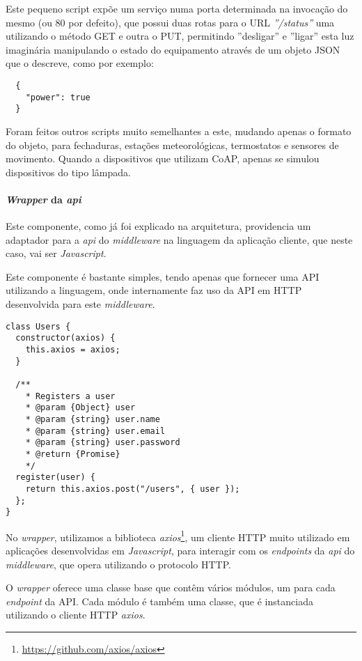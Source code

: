 Este pequeno script expõe um serviço numa porta determinada na invocação do mesmo (ou 80 por defeito), que possui duas rotas para o URL \textit{''/status''} uma utilizando o método GET e outra o PUT, permitindo ''desligar'' e ''ligar'' esta luz imaginária manipulando o estado do equipamento através de um objeto JSON que o descreve, como por exemplo:

\begin{verbatim}
  {
    "power": true
  }
\end{verbatim}

Foram feitos outros scripts muito semelhantes a este, mudando apenas o formato do objeto, para fechaduras, estações meteorológicas, termostatos e sensores de movimento. Quando a dispositivos que utilizam CoAP, apenas se simulou dispositivos do tipo lâmpada.

\paragraph*{\textit{Wrapper} da \textit{api}}

Este componente, como já foi explicado na arquitetura, providencia um adaptador para a \textit{api} do \textit{middleware} na linguagem da aplicação cliente, que neste caso, vai ser \textit{Javascript}. 

Este componente é bastante simples, tendo apenas que fornecer uma API utilizando a linguagem, onde internamente faz uso da API em HTTP desenvolvida para este \textit{middleware}.

\begin{verbatim}
class Users {
  constructor(axios) {
    this.axios = axios;
  }

  /**
    * Registers a user
    * @param {Object} user
    * @param {string} user.name
    * @param {string} user.email
    * @param {string} user.password
    * @return {Promise}
    */
  register(user) {
    return this.axios.post("/users", { user });
  };
}
\end{verbatim}

No \textit{wrapper}, utilizamos a biblioteca \textit{axios}\footnote{\url{https://github.com/axios/axios}}, um cliente HTTP muito utilizado em aplicações desenvolvidas em \textit{Javascript}, para interagir com os \textit{endpoints} da \textit{api} do \textit{middleware}, que opera utilizando o protocolo HTTP.

O \textit{wrapper} oferece uma classe base que contêm vários módulos, um para cada \textit{endpoint} da API. Cada módulo é também uma classe, que é instanciada utilizando o cliente HTTP \textit{axios}.

